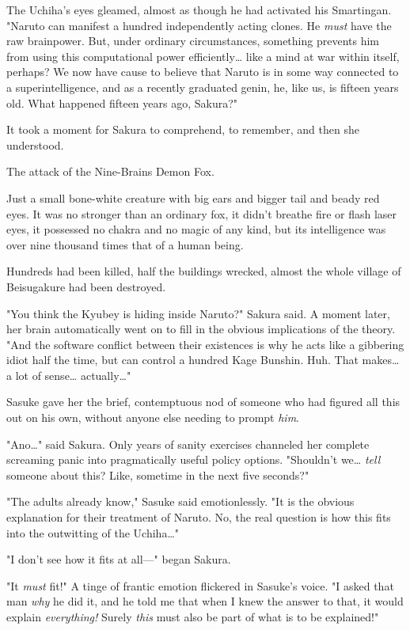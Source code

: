 The Uchiha's eyes gleamed, almost as though he had activated his Smartingan. 
"Naruto can manifest a hundred independently acting clones. He \emph{must} have 
the raw brainpower. But, under ordinary circumstances, something prevents him 
from using this computational power efficiently{\ldots} like a mind at war 
within itself, perhaps? We now have cause to believe that Naruto is in some way 
connected to a superintelligence, and as a recently graduated genin, he, like 
us, is fifteen years old. What happened fifteen years ago, Sakura?"

It took a moment for Sakura to comprehend, to remember, and then she understood.

The attack of the Nine-Brains Demon Fox.

Just a small bone-white creature with big ears and bigger tail and beady red 
eyes. It was no stronger than an ordinary fox, it didn't breathe fire or flash 
laser eyes, it possessed no chakra and no magic of any kind, but its 
intelligence was over nine thousand times that of a human being.

Hundreds had been killed, half the buildings wrecked, almost the whole village 
of Beisugakure had been destroyed.

"You think the Kyubey is hiding inside Naruto?" Sakura said. A moment later, 
her brain automatically went on to fill in the obvious implications of the 
theory. "And the software conflict between their existences is why he acts like 
a gibbering idiot half the time, but can control a hundred Kage Bunshin. Huh. 
That makes{\ldots} a lot of sense{\ldots} actually{\ldots}"

Sasuke gave her the brief, contemptuous nod of someone who had figured all this 
out on his own, without anyone else needing to prompt \emph{him}.

"Ano{\ldots}" said Sakura. Only years of sanity exercises channeled her 
complete screaming panic into pragmatically useful policy options. "Shouldn't 
we{\ldots} \emph{tell} someone about this? Like, sometime in the next five 
seconds?"

"The adults already know," Sasuke said emotionlessly. "It is the obvious 
explanation for their treatment of Naruto. No, the real question is how this 
fits into the outwitting of the Uchiha{\ldots}"

"I don't see how it fits at all---" began Sakura.

"It \emph{must} fit!" A tinge of frantic emotion flickered in Sasuke's voice. 
"I asked that man \emph{why} he did it, and he told me that when I knew the 
answer to that, it would explain \emph{everything!} Surely \emph{this} must 
also be part of what is to be explained!"

